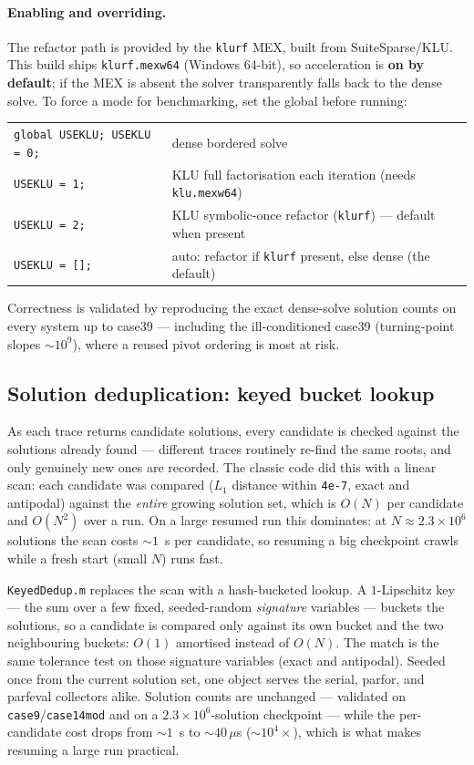 \documentclass[11pt,a4paper]{article}
\newcommand{\code}[1]{\texttt{#1}}
\begin{document}
\paragraph{Enabling and overriding.}
The refactor path is provided by the \code{klurf} MEX, built from SuiteSparse/KLU. This
build ships \code{klurf.mexw64} (Windows 64-bit), so acceleration is \textbf{on by default};
if the MEX is absent the solver transparently falls back to the dense solve. To force a mode
for benchmarking, set the global before running:
\begin{center}
\begin{tabular}{@{}ll@{}}
\toprule
\code{global USEKLU; USEKLU = 0;} & dense bordered solve\\
\code{USEKLU = 1;}  & KLU full factorisation each iteration (needs \code{klu.mexw64})\\
\code{USEKLU = 2;}  & KLU symbolic-once refactor (\code{klurf}) --- default when present\\
\code{USEKLU = [];} & auto: refactor if \code{klurf} present, else dense (the default)\\
\bottomrule
\end{tabular}
\end{center}
Correctness is validated by reproducing the exact dense-solve solution counts on every
system up to case39 --- including the ill-conditioned case39 (turning-point slopes
$\sim\!10^9$), where a reused pivot ordering is most at risk.

\subsection{Solution deduplication: keyed bucket lookup}\label{sec:dedup}
As each trace returns candidate solutions, every candidate is checked against the solutions
already found --- different traces routinely re-find the same roots, and only genuinely new
ones are recorded. The classic code did this with a linear scan: each candidate was compared
($L_1$ distance within \code{4e-7}, exact and antipodal) against the \emph{entire} growing
solution set, which is $O(N)$ per candidate and $O(N^2)$ over a run. On a large resumed run
this dominates: at $N\approx2.3\times10^{6}$ solutions the scan costs ${\sim}1$~s per
candidate, so resuming a big checkpoint crawls while a fresh start (small $N$) runs fast.

\code{KeyedDedup.m} replaces the scan with a hash-bucketed lookup. A $1$-Lipschitz key --- the
sum over a few fixed, seeded-random \emph{signature} variables --- buckets the solutions, so a
candidate is compared only against its own bucket and the two neighbouring buckets: $O(1)$
amortised instead of $O(N)$. The match is the same tolerance test on those signature
variables (exact and antipodal). Seeded once from the current solution set, one object serves
the serial, parfor, and parfeval collectors alike. Solution counts are unchanged ---
validated on \code{case9}/\code{case14mod} and on a $2.3\times10^{6}$-solution checkpoint ---
while the per-candidate cost drops from ${\sim}1$~s to ${\sim}40\,\mu$s (${\sim}10^{4}\times$),
which is what makes resuming a large run practical.
\end{document}
